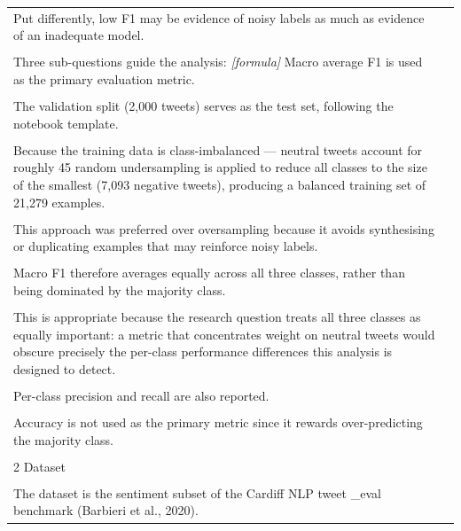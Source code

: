 \documentclass[11pt]{article}
\begin{document}
\begin{longtable}{|p{}|p{}|}
\hline
\rule{0pt}{3.5cm} & \\
\hline
Put differently, low F1 may be evidence of noisy labels as much as evidence of an inadequate model. & \\[2pt]
\hline
\rule{0pt}{3.5cm} & \\
\hline
Three sub-questions guide the analysis: \textit{[formula]} Macro average F1 is used as the primary evaluation metric. & \\[2pt]
\hline
\rule{0pt}{3.5cm} & \\
\hline
The validation split (2,000 tweets) serves as the test set, following the notebook template. & \\[2pt]
\hline
\rule{0pt}{3.5cm} & \\
\hline
Because the training data is class-imbalanced --- neutral tweets account for roughly 45 random undersampling is applied to reduce all classes to the size of the smallest (7,093 negative tweets), producing a balanced training set of 21,279 examples. & \\[2pt]
\hline
\rule{0pt}{3.5cm} & \\
\hline
This approach was preferred over oversampling because it avoids synthesising or duplicating examples that may reinforce noisy labels. & \\[2pt]
\hline
\rule{0pt}{3.5cm} & \\
\hline
Macro F1 therefore averages equally across all three classes, rather than being dominated by the majority class. & \\[2pt]
\hline
\rule{0pt}{3.5cm} & \\
\hline
This is appropriate because the research question treats all three classes as equally important: a metric that concentrates weight on neutral tweets would obscure precisely the per-class performance differences this analysis is designed to detect. & \\[2pt]
\hline
\rule{0pt}{3.5cm} & \\
\hline
Per-class precision and recall are also reported. & \\[2pt]
\hline
\rule{0pt}{3.5cm} & \\
\hline
Accuracy is not used as the primary metric since it rewards over-predicting the majority class. & \\[2pt]
\hline
\rule{0pt}{3.5cm} & \\
\hline
2 Dataset & \\[2pt]
\hline
\rule{0pt}{3.5cm} & \\
\hline
The dataset is the sentiment subset of the Cardiff NLP tweet \_eval benchmark (Barbieri et al., 2020). & \\[2pt]

\end{longtable}
\end{document}
